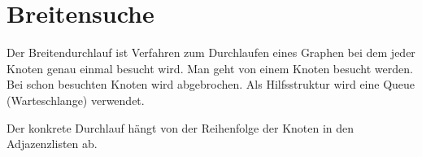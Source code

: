 \documentclass{lehramt-informatik-haupt}
\begin{document}

%

\section{Breitensuche}

\begin{quellen}
\item \cite[Seite 53-64 (PDF 46-57)]{aud:fs:6}
\item \cite[Kapitel 6.2.2.2 Graphalgorithmen, Seite 185]{schneider}
\end{quellen}

Der Breitendurchlauf ist Verfahren zum Durchlaufen eines Graphen bei dem
jeder Knoten genau einmal besucht wird. Man geht von einem Knoten
  besucht
werden. Bei schon besuchten Knoten wird abgebrochen. Als Hilfsstruktur
wird eine Queue (Warteschlange) verwendet.

Der konkrete Durchlauf hängt von der Reihenfolge der Knoten in den
Adjazenzlisten ab.

\TmpGraph
\end{document}
